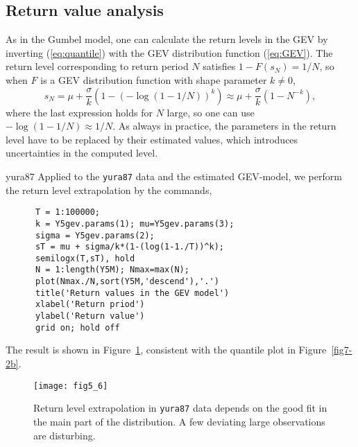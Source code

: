 
\subsection{Return value analysis}\label{subsec_returnvalueanalysis}
As in the Gumbel model, one can calculate the return levels in the GEV
by inverting (\ref{eq:quantile}) with the GEV distribution function
(\ref{eq:GEV}). The return level corresponding to return period $N$
satisfies $1-F(s_N)=1/N$, so when $F$ is a GEV distribution function
with shape parameter $k \neq 0$,
\begin{equation}
s_N = \mu + \frac{\sigma}{k} \left( 1 - (- \log (1 - 1/N) )^{k} \right)
\approx \mu + \frac{\sigma}{k} \left( 1 - N^{-k} \right),
\label{eq:return_gev}
\end{equation}
where the last expression holds for $N$ large, so one
can use $- \log (1 - 1/N) \approx 1/N$. As always in practice, the
parameters in the return level have to be replaced by their
estimated values, which introduces uncertainties in the computed
level.
\begin{cex}{yura87}
Applied to the {\tt yura87} data and the estimated GEV-model,
we perform the return level extrapolation by the commands,
{\small
\begin{verbatim}
      T = 1:100000;
      k = Y5gev.params(1); mu=Y5gev.params(3);
      sigma = Y5gev.params(2);
      sT = mu + sigma/k*(1-(log(1-1./T))^k);
      semilogx(T,sT), hold
      N = 1:length(Y5M); Nmax=max(N);
      plot(Nmax./N,sort(Y5M,'descend'),'.')
      title('Return values in the GEV model')
      xlabel('Return priod')
      ylabel('Return value')
      grid on; hold off
\end{verbatim}
}
\noindent
The result is shown in Figure~\ref{fig_yurareturn},
 consistent with the
quantile plot in Figure~\ref{fig7-2b}.
\end{cex}
\begin{figure}[tbh]
\centerline{
\texttt{[image: fig5\_6]}
}
\vspace{-3mm}
\caption[Return level extrapolation]{
Return level extrapolation in  {\tt yura87} data depends
on the good fit in the main part of the distribution. A few deviating
large observations are disturbing.}
\label{fig_yurareturn}
\end{figure}

